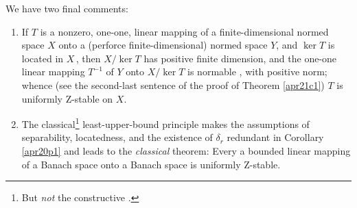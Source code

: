 \documentclass[11pt]{article}%
\begin{document}
%

\medskip


We have two final comments:

\begin{enumerate}
\item If $T$ is a nonzero, one-one, linear mapping of a finite-dimensional
normed space $X$ onto a (perforce finite-dimensional) normed space $Y$, and
$\ker T$ is located in $X\,$, then $X/\ker T$ has positive finite dimension,
and the one-one linear mapping $T^{-1}$ of $Y$ onto $X/\ker T$ is normable
\cite[4.1.8]{BVtech}, with positive norm; whence (see the second-last sentence
of the proof of Theorem \ref{apr21c1}) $T$ is uniformly Z-stable on $X$.

\item The classical\footnote{%
\normalfont\sf
But \emph{not} the constructive \cite[2.1.18]{BVtech}.} least-upper-bound
principle makes the assumptions of separability, locatedness, and the
existence of $\delta_{r}$ redundant in Corollary \ref{apr20p1} and leads to
the \emph{classical} theorem: Every a bounded linear mapping of a Banach space
onto a Banach space is uniformly Z-stable.
\end{enumerate}

%

\bigskip
\end{document}
